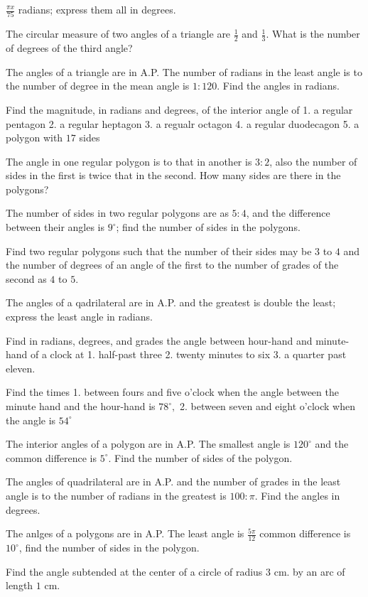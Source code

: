     $\frac{\pi x}{75}$ radians; express them all in degrees.
\item The circular measure of two angles of a triangle are $\frac{1}{2}$ and $\frac{1}{3}$. What is the number of degrees
    of the third angle?
\item The angles of a triangle are in A.P. The number of radians in the least angle is to the number of degree in the mean angle is
    $1:120$. Find the angles in radians.
\item Find the magnitude, in radians and degrees, of the interior angle of 1. a regular pentagon 2. a regular heptagon 3. a regualr
    octagon 4. a regular duodecagon 5. a polygon with $17$ sides
\item The angle in one regular polygon is to that in another is $3:2$, also the number of sides in the first is twice that in
    the second. How many sides are there in the polygons?
\item The number of sides in two regular polygons are as $5:4$, and the difference between their angles is $9^\circ$;
    find the number of sides in the polygons.
\item Find two regular polygons such that the number of their sides may be $3$ to $4$ and the number of degrees of an
    angle of the first to the number of grades of the second as $4$ to $5.$
\item The angles of a qadrilateral are in A.P. and the greatest is double the least; express the least angle in radians.
\item Find in radians, degrees, and grades the angle between hour-hand and minute-hand of a clock at 1. half-past three 2. twenty
    minutes to six 3. a quarter past eleven.
\item Find the times 1. between fours and five o'clock when the angle between the minute hand and the hour-hand is
    $78^\circ,$ 2. between seven and eight o'clock when the angle is $54^\circ$
\item The interior angles of a polygon are in A.P. The smallest angle is $120^\circ$ and the common difference is
    $5^\circ$. Find the number of sides of the polygon.
\item The angles of quadrilateral are in A.P. and the number of grades in the least angle is to the number of radians in the greatest is
    $100:\pi$. Find the angles in degrees.
\item The anlges of a polygons are in A.P. The least angle is $\frac{5\pi}{12}$ common difference is $10^\circ$, find the
    number of sides in the polygon.
\item Find the angle subtended at the center of a circle of radius $3$ cm. by an arc of length $1$ cm.
